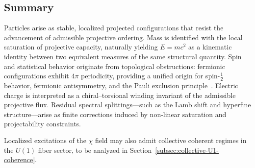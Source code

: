 \subsection{Summary}
  \label{subsec:summary-particles}

  Particles arise as stable, localized projected configurations that resist
  the advancement of admissible projective ordering.
  Mass is identified with the local saturation of projective capacity,
  naturally yielding $E = mc^2$ as a kinematic identity between two
  equivalent measures of the same structural quantity.
  Spin and statistical behavior originate from topological obstructions:
  fermionic configurations exhibit $4\pi$ periodicity, providing a unified
  origin for spin-$\tfrac{1}{2}$ behavior, fermionic antisymmetry, and the Pauli
  exclusion principle~\cite{Pauli1925,Dirac1928}.
  Electric charge is interpreted as a chiral--torsional winding invariant
  of the admissible projective flux.
  Residual spectral splittings---such as the Lamb shift and hyperfine
  structure---arise as finite corrections induced by non-linear saturation
  and projectability constraints.

  Localized excitations of the $\chi$ field may also admit collective
  coherent regimes in the $U(1)$ fiber sector, to be analyzed in
  Section~\ref{subsec:collective-U1-coherence}.
